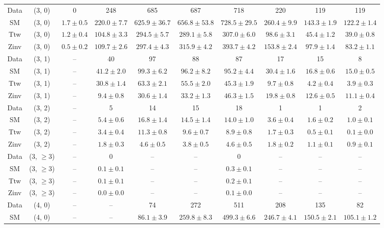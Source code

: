 \begin{table}[h!]
{\begin{tabular}{cccccccccc}
	Data & (3, 0) & 0 & 248 & 685 & 687 & 718 & 220 & 119 & 119 \\[0.5ex] 
	SM & (3, 0) & $1.7\pm 0.5$ & $220.0\pm 7.7$ & $625.9\pm 36.7$ & $656.8\pm 53.8$ & $728.5\pm 29.5$ & $260.4\pm 9.9$ & $143.3\pm 1.9$ & $122.2\pm 1.4$ \\[0.5ex] 
	Ttw & (3, 0) & $1.2\pm 0.4$ & $104.8\pm 3.3$ & $294.5\pm 5.7$ & $289.1\pm 5.8$ & $307.0\pm 6.0$ & $98.6\pm 3.1$ & $45.4\pm 1.2$ & $39.0\pm 0.8$ \\[0.5ex] 
	Zinv & (3, 0) & $0.5\pm 0.2$ & $109.7\pm 2.6$ & $297.4\pm 4.3$ & $315.9\pm 4.2$ & $393.7\pm 4.2$ & $153.8\pm 2.4$ & $97.9\pm 1.4$ & $83.2\pm 1.1$ \\[0.5ex] 
	Data & (3, 1) & -- & 40 & 97 & 88 & 87 & 17 & 15 & 8 \\[0.5ex] 
	SM & (3, 1) & -- & $41.2\pm 2.0$ & $99.3\pm 6.2$ & $96.2\pm 8.2$ & $95.2\pm 4.4$ & $30.4\pm 1.6$ & $16.8\pm 0.6$ & $15.0\pm 0.5$ \\[0.5ex] 
	Ttw & (3, 1) & -- & $30.8\pm 1.4$ & $63.3\pm 2.1$ & $55.5\pm 2.0$ & $45.3\pm 1.9$ & $9.7\pm 0.8$ & $4.2\pm 0.4$ & $3.9\pm 0.3$ \\[0.5ex] 
	Zinv & (3, 1) & -- & $9.4\pm 0.8$ & $30.6\pm 1.4$ & $33.2\pm 1.3$ & $46.3\pm 1.5$ & $19.8\pm 0.8$ & $12.6\pm 0.5$ & $11.1\pm 0.4$ \\[0.5ex] 
	Data & (3, 2) & -- & 5 & 14 & 15 & 18 & 1 & 1 & 2 \\[0.5ex] 
	SM & (3, 2) & -- & $5.4\pm 0.6$ & $16.8\pm 1.4$ & $14.5\pm 1.4$ & $14.0\pm 1.0$ & $3.6\pm 0.4$ & $1.6\pm 0.2$ & $1.0\pm 0.1$ \\[0.5ex] 
	Ttw & (3, 2) & -- & $3.4\pm 0.4$ & $11.3\pm 0.8$ & $9.6\pm 0.7$ & $8.9\pm 0.8$ & $1.7\pm 0.3$ & $0.5\pm 0.1$ & $0.1\pm 0.0$ \\[0.5ex] 
	Zinv & (3, 2) & -- & $1.8\pm 0.3$ & $4.6\pm 0.5$ & $3.8\pm 0.5$ & $4.6\pm 0.5$ & $1.8\pm 0.2$ & $1.1\pm 0.1$ & $0.9\pm 0.1$ \\[0.5ex] 
	Data & (3, $\ge3$) & -- & 0 & -- & -- & 0 & -- & -- & -- \\[0.5ex] 
	SM & (3, $\ge3$) & -- & $0.1\pm 0.1$ & -- & -- & $0.3\pm 0.1$ & -- & -- & -- \\[0.5ex] 
	Ttw & (3, $\ge3$) & -- & $0.1\pm 0.1$ & -- & -- & $0.2\pm 0.1$ & -- & -- & -- \\[0.5ex] 
	Zinv & (3, $\ge3$) & -- & $0.0\pm 0.0$ & -- & -- & $0.1\pm 0.0$ & -- & -- & -- \\[0.5ex] 
	Data & (4, 0) & -- & -- & 74 & 272 & 511 & 208 & 135 & 82 \\[0.5ex] 
	SM & (4, 0) & -- & -- & $86.1\pm 3.9$ & $259.8\pm 8.3$ & $499.3\pm 6.6$ & $246.7\pm 4.1$ & $150.5\pm 2.1$ & $105.1\pm 1.2$ \\[0.5ex] 

\end{tabular}}
\end{table}
